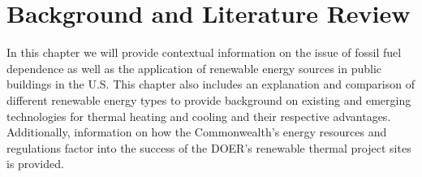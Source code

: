 
\chapter{Background and Literature Review}
\par In this chapter we will provide contextual information on the issue of fossil fuel dependence as well as the application of renewable energy sources in public buildings in the U.S. This chapter also includes an explanation and comparison of different renewable energy types to provide background on existing and emerging technologies for thermal heating and cooling and their respective advantages. Additionally, information on how the Commonwealth's energy resources and regulations factor into the success of the DOER's renewable thermal project sites is provided.


